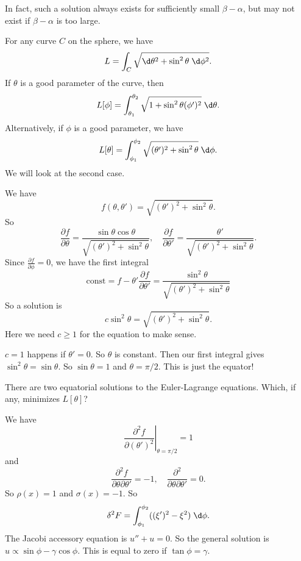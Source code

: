 \documentclass[a4paper]{article}
\begin{document}
In fact, such a solution always exists for sufficiently small $\beta - \alpha$, but may not exist if $\beta - \alpha$ is too large.


\begin{eg}
  For any curve $C$ on the sphere, we have
  \[
    L = \int_C \sqrt{\d \theta^2 + \sin^2 \theta \;\d \phi^2}.
  \]
  If $\theta$ is a good parameter of the curve, then
  \[
    L[\phi] = \int_{\theta _1}^{\theta_2} \sqrt{1 + \sin^2 \theta (\phi')^2}\;\d \theta.
  \]
  Alternatively, if $\phi$ is a good parameter, we have
  \[
    L[\theta] = \int_{\phi_1}^{\phi_2}\sqrt{(\theta')^2 + \sin^2 \theta}\;\d \phi.
  \]
  We will look at the second case.

  We have
  \[
    f(\theta, \theta') = \sqrt{(\theta')^2 + \sin^2 \theta}.
  \]
  So
  \[
    \frac{\partial f}{\partial \theta} = \frac{\sin \theta\cos \theta}{\sqrt{(\theta')^2 + \sin^2 \theta}},\quad \frac{\partial f}{\partial \theta'} = \frac{\theta'}{\sqrt{(\theta')^2 + \sin^2 \theta}}.
  \]
  Since $\frac{\partial f}{\partial \phi} = 0$, we have the first integral
  \[
    \text{const} = f - \theta' \frac{\partial f}{\partial \theta'} = \frac{\sin^2 \theta}{\sqrt{(\theta')^2 + \sin^2 \theta}}
  \]
  So a solution is
  \[
    c\sin^2 \theta = \sqrt{(\theta')^2 + \sin^2 \theta}.
  \]
  Here we need $c \geq 1$ for the equation to make sense.
  
  $c = 1$ happens if $\theta' = 0$. So $\theta$ is constant. Then our first integral gives $\sin^2 \theta = \sin \theta$. So $\sin \theta = 1$ and $\theta = \pi/2$. This is just the equator!

  There are two equatorial solutions to the Euler-Lagrange equations. Which, if any, minimizes $L[\theta]$?
  \begin{center}
  \end{center}
  We have
  \[
    \left.\frac{\partial^2 f}{\partial (\theta')^2}\right|_{\theta = \pi/2} = 1
  \]
  and
  \[
    \frac{\partial^2 f}{\partial \theta \partial \theta'} = -1,\quad \frac{\partial^2}{\partial \theta\partial \theta'} = 0.
  \]
  So $\rho(x) = 1$ and $\sigma(x) = -1$. So
  \[
    \delta^2 F = \int_{\phi_1}^{\phi_2} ((\xi')^2 - \xi^2)\;\d \phi.
  \]
  The Jacobi accessory equation is $u'' + u = 0$. So the general solution is $u \propto \sin \phi - \gamma \cos\phi$. This is equal to zero if $\tan \phi = \gamma$.
  

\end{eg}
\end{document}
